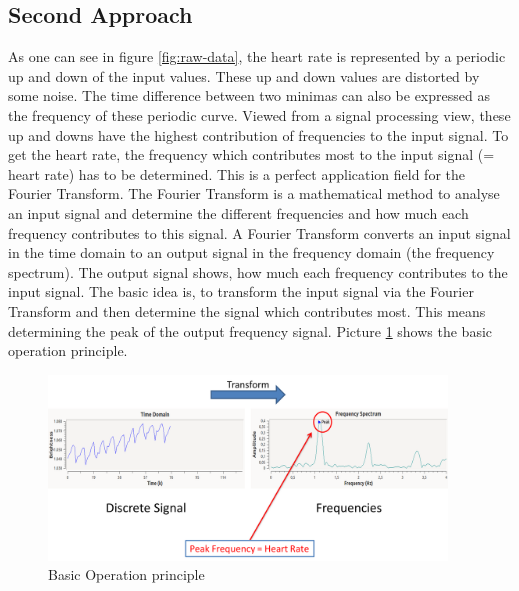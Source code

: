 \documentclass[notitlepage]{scrreprt}
\begin{document}
\subsection{Second Approach}
As one can see in figure \ref{fig:raw-data}, the heart rate is represented by a periodic up and down of the input values. These up and down values are distorted by some noise. The time difference between two minimas can also be expressed as the frequency of these periodic curve. Viewed from a signal processing view, these up and downs have the highest contribution of frequencies to the input signal. To get the heart rate, the frequency which contributes most to the input signal (= heart rate) has to be determined. This is a perfect application field for the Fourier Transform. The Fourier Transform is a mathematical method to analyse an input signal and determine the different frequencies and how much each frequency contributes to this signal. A Fourier Transform converts an input signal in the time domain to an output signal in the frequency domain (the frequency spectrum). The output signal shows, how much each frequency contributes to the input signal. The basic idea is, to transform the input signal via the Fourier Transform and then determine the signal which contributes most. This means determining the peak of the output frequency signal. Picture \ref{fig:basic-operation} shows the basic operation principle.

\begin{figure}[H]
	\centering
	\includegraphics[width=400px]{images/basicOperation.png}
	\caption{Basic Operation principle}
	\label{fig:basic-operation}
\end{figure}
\end{document}

